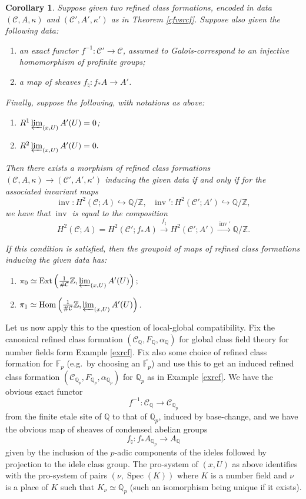 \documentclass[12pt]{article}
\newtheorem{corollary}[theorem]{Corollary}
\theoremstyle{definition}
\newcommand{\on}{\operatorname}
\newcommand{\mc}{\mathcal}
\newcommand{\mbb}{\mathbb}
\begin{document}
\begin{corollary}
Suppose given two refined class formations, encoded in data $(\mc{C},A,\kappa)$ and $(\mc{C}',A',\kappa')$ as in Theorem \ref{cfvsrcf}.  Suppose also given the following data:
\begin{enumerate}
\item an exact functor $f^{-1}:\mc{C}'\to\mc{C}$, assumed to Galois-correspond to an injective homomorphism of profinite groups;
\item a map of sheaves $f_\natural:f_\ast A \to A'$.
\end{enumerate}
Finally, suppose the following, with notations as above:
\begin{enumerate}
\item $R^1\varprojlim_{(x,U)} A'(U)=0$;
\item $R^2\varprojlim_{(x,U)} A'(U)=0.$
\end{enumerate}
Then there exists a morphism of refined class formations $(\mc{C},A,\kappa) \to (\mc{C}',A',\kappa')$ inducing the given data if and only if for the associated invariant maps
$$\on{inv}:H^2(\mc{C};A)\hookrightarrow\mbb{Q}/\mbb{Z}, \text{   }\on{inv}':H^2(\mc{C}';A')\hookrightarrow\mbb{Q}/\mbb{Z},$$
we have that $\on{inv}$ is equal to the composition
$$H^2(\mc{C};A) = H^2(\mc{C}';f_\ast A)\overset{f_\natural}{\longrightarrow}  H^2(\mc{C}';A')\overset{\on{inv}'}{\longrightarrow}\mbb{Q}/\mbb{Z}.$$

If this condition is satisfied, then the groupoid of maps of refined class formations inducing the given data has:
\begin{enumerate}
\item $\pi_0\simeq \on{Ext}\left(\frac{1}{\#\mc{C}}\mbb{Z},\varprojlim_{(x,U)}A'(U)\right);$

\item $\pi_1 \simeq \on{Hom}\left(\frac{1}{\#\mc{C}}\mbb{Z}, \varprojlim_{(x,U)} A'(U)\right)$.
\end{enumerate}
\end{corollary}

Let us now apply this to the question of local-global compatibility.  Fix the canonical refined class formation $(\mc{C}_\mbb{Q},F_\mbb{Q},\alpha_\mbb{Q})$ for global class field theory for number fields form Example \ref{exrcf}.  Fix also some choice of refined class formation for $\mbb{F}_p$ (e.g.\ by choosing an $\overline{\mbb{F}_p}$) and use this to get an induced refined class formation $(\mc{C}_{\mbb{Q}_p},F_{\mbb{Q}_p},\alpha_{\mbb{Q}_p})$ for $\mbb{Q}_p$ as in Example \ref{exrcf}.  We have the obvious exact functor
$$f^{-1}:\mc{C}_\mbb{Q} \to \mc{C}_{\mbb{Q}_p}$$
from the finite etale site of $\mbb{Q}$ to that of $\mbb{Q}_p$, induced by base-change, and we have the obvious map of sheaves of condensed abelian groups
$$f_\natural: f_\ast A_{\mbb{Q}_p}\to A_\mbb{Q}$$
given by the inclusion of the $p$-adic components of the ideles followed by projection to the idele class group.  The pro-system of $(x,U)$ as above identifies with the pro-system of pairs $(\nu,\on{Spec}(K))$ where $K$ is a number field and $\nu$ is a place of $K$ such that $K_\nu\simeq\mbb{Q}_p$ (such an isomorphism being unique if it exists).
\end{document}
